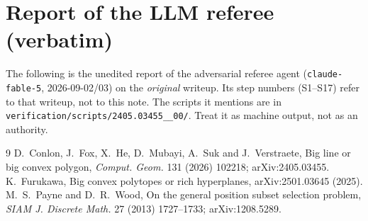 \documentclass[11pt,a4paper]{article}
\theoremstyle{plain}
\theoremstyle{definition}
\theoremstyle{remark}
\begin{document}
\section{Report of the LLM referee (verbatim)}\label{app:referee}

\begin{tcolorbox}[colback=gray!8,colframe=gray!50,boxrule=0.4pt,arc=2pt]
\small The following is the unedited report of the adversarial referee agent (\texttt{claude-fable-5}, 2026-09-02/03) on the \emph{original} writeup. Its step numbers (S1--S17) refer to that writeup, not to this note. The scripts it mentions are in \texttt{verification/scripts/2405.03455\_\_00/}. Treat it as machine output, not as an authority.
\end{tcolorbox}



\begin{thebibliography}{9}
 D.~Conlon, J.~Fox, X.~He, D.~Mubayi, A.~Suk and J.~Verstraete, Big line or big convex polygon, \emph{Comput. Geom.} 131 (2026) 102218; arXiv:2405.03455.
 K.~Furukawa, Big convex polytopes or rich hyperplanes, arXiv:2501.03645 (2025).
 M.~S.~Payne and D.~R.~Wood, On the general position subset selection problem, \emph{SIAM J. Discrete Math.} 27 (2013) 1727--1733; arXiv:1208.5289.
\end{thebibliography}
\end{document}
